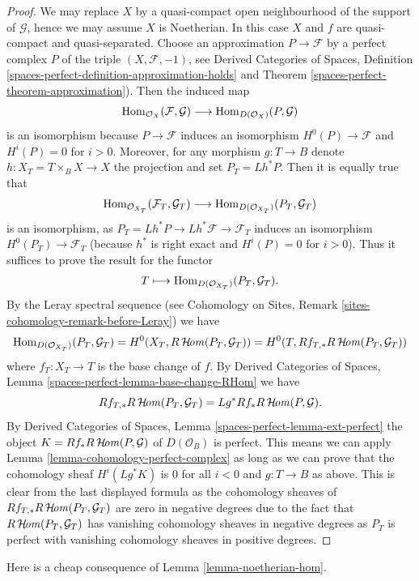 \begin{proof}
We may replace $X$ by a quasi-compact open neighbourhood of
the support of $\mathcal{G}$, hence we may assume $X$ is Noetherian.
In this case $X$ and $f$ are quasi-compact and quasi-separated.
Choose an approximation $P \to \mathcal{F}$ by a perfect complex $P$ of
the triple $(X, \mathcal{F}, -1)$, see
Derived Categories of Spaces, Definition
\ref{spaces-perfect-definition-approximation-holds} and
Theorem \ref{spaces-perfect-theorem-approximation}).
Then the induced map
$$
\mathop{\mathrm{Hom}}\nolimits_{\mathcal{O}_X}(\mathcal{F}, \mathcal{G})
\longrightarrow
\mathop{\mathrm{Hom}}\nolimits_{D(\mathcal{O}_X)}(P, \mathcal{G})
$$
is an isomorphism because $P \to \mathcal{F}$ induces an isomorphism
$H^0(P) \to \mathcal{F}$ and $H^i(P) = 0$ for $i > 0$.
Moreover, for any morphism $g : T \to B$
denote $h : X_T = T \times_B X \to X$ the projection and set
$P_T = Lh^*P$. Then it is equally true that
$$
\mathop{\mathrm{Hom}}\nolimits_{\mathcal{O}_{X_T}}(\mathcal{F}_T, \mathcal{G}_T)
\longrightarrow
\mathop{\mathrm{Hom}}\nolimits_{D(\mathcal{O}_{X_T})}(P_T, \mathcal{G}_T)
$$
is an isomorphism, as $P_T = Lh^*P \to Lh^*\mathcal{F} \to \mathcal{F}_T$
induces an isomorphism $H^0(P_T) \to \mathcal{F}_T$ (because $h^*$ is
right exact and $H^i(P) = 0$ for $i > 0$). Thus it suffices to prove the
result for the functor
$$
T \longmapsto \mathop{\mathrm{Hom}}\nolimits_{D(\mathcal{O}_{X_T})}(P_T, \mathcal{G}_T).
$$
By the Leray spectral sequence (see Cohomology on Sites, Remark
\ref{sites-cohomology-remark-before-Leray}) we have
$$
\mathop{\mathrm{Hom}}\nolimits_{D(\mathcal{O}_{X_T})}(P_T, \mathcal{G}_T) =
H^0(X_T, R\mathop{\mathcal{H}\!\mathit{om}}\nolimits(P_T, \mathcal{G}_T)) =
H^0(T, Rf_{T, *}R\mathop{\mathcal{H}\!\mathit{om}}\nolimits(P_T, \mathcal{G}_T))
$$
where $f_T : X_T \to T$ is the base change of $f$. By
Derived Categories of Spaces, Lemma
\ref{spaces-perfect-lemma-base-change-RHom}
we have
$$
Rf_{T, *}R\mathop{\mathcal{H}\!\mathit{om}}\nolimits(P_T, \mathcal{G}_T) = Lg^*Rf_*R\mathop{\mathcal{H}\!\mathit{om}}\nolimits(P, \mathcal{G}).
$$
By
Derived Categories of Spaces, Lemma
\ref{spaces-perfect-lemma-ext-perfect}
the object $K = Rf_*R\mathop{\mathcal{H}\!\mathit{om}}\nolimits(P, \mathcal{G})$ of $D(\mathcal{O}_B)$
is perfect. This means we can apply
Lemma \ref{lemma-cohomology-perfect-complex}
as long as we can prove that the cohomology sheaf
$H^i(Lg^*K)$ is $0$ for all $i < 0$ and $g : T \to B$ as above.
This is clear from the last displayed formula as
the cohomology sheaves of
$Rf_{T, *}R\mathop{\mathcal{H}\!\mathit{om}}\nolimits(P_T, \mathcal{G}_T)$
are zero in negative degrees
due to the fact that $R\mathop{\mathcal{H}\!\mathit{om}}\nolimits(P_T, \mathcal{G}_T)$ has vanishing
cohomology sheaves in negative degrees as $P_T$ is perfect with
vanishing cohomology sheaves in positive degrees.
\end{proof}

\noindent
Here is a cheap consequence of Lemma \ref{lemma-noetherian-hom}.

